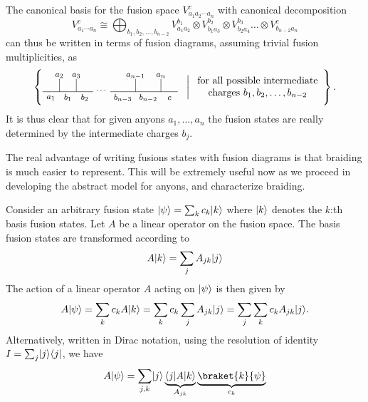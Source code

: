 \documentclass[a4paper,10pt,oneside]{book}
\theoremstyle{plain}
\theoremstyle{definition}
\theoremstyle{remark}
\DeclarePairedDelimiter\bra{\langle}{\rvert}
\DeclarePairedDelimiter\ket{\lvert}{\rangle}
\begin{document}
The canonical basis for the fusion space $V_{a_1a_2\cdots a_n}^c$ with canonical decomposition
\begin{equation}
  V_{a_1 \cdots a_n}^c \cong \bigoplus_{b_1,b_2,\ldots,b_{n-2}} V_{a_1a_2}^{b_1} \otimes V_{b_1 a_3}^{b_2} \otimes V_{b_2 a_4}^{b_3} \ldots \otimes V_{b_{n-2} a_n}^c
\end{equation}
can thus be written in terms of fusion diagrams, assuming trivial fusion multiplicities, as
\begin{equation}
  \left\{
  \begin{tikzpicture}[scale=0.3,font=\footnotesize,anchor=mid,baseline={([yshift=-.5ex]current bounding box.center)}]
    \node at (0, -0.6) {$a_1$};
    \node at (1, 2) {$a_2$};
    \node at (3, 2) {$a_3$};
    \node at (10, 2) {$a_{n-1}$};
    \node at (13, 2) {$a_n$};
%
    \draw (1, 0) to (1, 1.5);
    \draw (3, 0) to (3, 1.5);
%
    \draw (10, 0) to (10, 1.5);
    \draw (13, 0) to (13, 1.5);
%
    \draw (-1, 0) to (5, 0);
    \draw (7, 0) to (15, 0);
%
    \node at (2, -0.7) {$b_1$};
    \node at (4, -0.7) {$b_2$};
    \node at (6, 0.2) {$\cdots$};
%
    \node at (8.5, -0.7) {$b_{n-3}$};
    \node at (11.5, -0.7) {$b_{n-2}$};
    \node at (14, -0.7) {$c$};
  \end{tikzpicture}
  \;\;\;\bigg|\; \begin{array}{c}\text{for all possible intermediate} \\ \text{charges $b_1, b_2, \ldots, b_{n-2}$}\end{array}
  \right\}.
\end{equation}
It is thus clear that for given anyons $a_1, \ldots, a_n$ the fusion states are really determined by the intermediate charges $b_j$.

The real advantage of writing fusions states with fusion diagrams is that braiding is much easier to represent. This will be extremely useful now as we proceed in developing the abstract model for anyons, and characterize braiding.

Consider an arbitrary fusion state $\ket{\psi} = \sum_k c_k \ket{k}$ where $\ket{k}$ denotes the $k$:th basis fusion states. Let $A$ be a linear operator on the fusion space. The basis fusion states are transformed according to
\begin{equation}\label{eq:linear op on basis state}
  A\ket{k} = \sum_j A_{jk} \ket{j}
\end{equation}
The action of a linear operator $A$ acting on $\ket{\psi}$ is then given by
\begin{equation}
  A \ket{\psi} = \sum_k c_k A \ket{k} = \sum_{k} c_k \sum_j A_{jk} \ket{j} = \sum_j \sum_k c_k A_{jk} \ket{j}.
\end{equation}
Alternatively, written in Dirac notation, using the resolution of identity $I = \sum_j \ket{j}\bra{j}$, we have
\begin{equation}
  A \ket{\psi} = \sum_{j,k} \ket{j} \underbrace{\bra{j} A \ket{k}}_{A_{jk}} \underbrace{\braket{k}{\psi}}_{c_k}
\end{equation}
\end{document}
